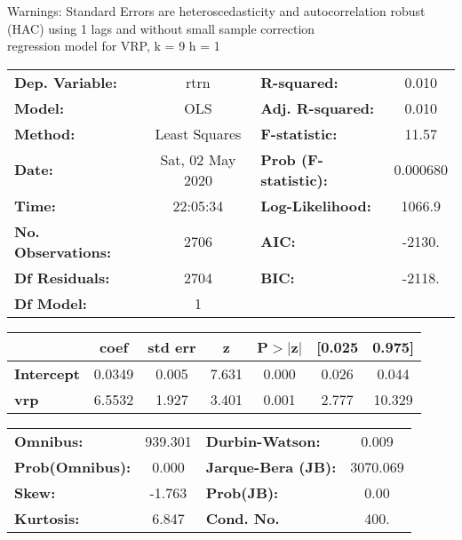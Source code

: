 Warnings: \newline
 [1] Standard Errors are heteroscedasticity and autocorrelation robust (HAC) using 1 lags and without small sample correction\\ 

regression model for VRP, k = 9 h = 1\begin{center}
\begin{tabular}{lclc}
\toprule
\textbf{Dep. Variable:}    &       rtrn       & \textbf{  R-squared:         } &     0.010   \\
\textbf{Model:}            &       OLS        & \textbf{  Adj. R-squared:    } &     0.010   \\
\textbf{Method:}           &  Least Squares   & \textbf{  F-statistic:       } &     11.57   \\
\textbf{Date:}             & Sat, 02 May 2020 & \textbf{  Prob (F-statistic):} &  0.000680   \\
\textbf{Time:}             &     22:05:34     & \textbf{  Log-Likelihood:    } &    1066.9   \\
\textbf{No. Observations:} &        2706      & \textbf{  AIC:               } &    -2130.   \\
\textbf{Df Residuals:}     &        2704      & \textbf{  BIC:               } &    -2118.   \\
\textbf{Df Model:}         &           1      & \textbf{                     } &             \\
\bottomrule
\end{tabular}
\begin{tabular}{lcccccc}
                   & \textbf{coef} & \textbf{std err} & \textbf{z} & \textbf{P$> |$z$|$} & \textbf{[0.025} & \textbf{0.975]}  \\
\midrule
\textbf{Intercept} &       0.0349  &        0.005     &     7.631  &         0.000        &        0.026    &        0.044     \\
\textbf{vrp}       &       6.5532  &        1.927     &     3.401  &         0.001        &        2.777    &       10.329     \\
\bottomrule
\end{tabular}
\begin{tabular}{lclc}
\textbf{Omnibus:}       & 939.301 & \textbf{  Durbin-Watson:     } &    0.009  \\
\textbf{Prob(Omnibus):} &   0.000 & \textbf{  Jarque-Bera (JB):  } & 3070.069  \\
\textbf{Skew:}          &  -1.763 & \textbf{  Prob(JB):          } &     0.00  \\
\textbf{Kurtosis:}      &   6.847 & \textbf{  Cond. No.          } &     400.  \\
\bottomrule
\end{tabular}
\end{center}


